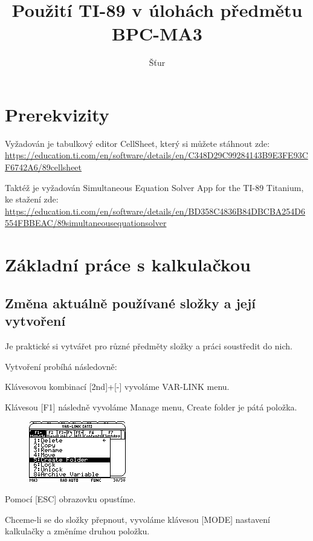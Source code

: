 \documentclass[10pt,a4paper,float]{article}
\author{Šťur}
\title{Použití TI-89 v úlohách předmětu BPC-MA3}
\begin{document}
\maketitle

\pagebreak

\section{Prerekvizity}
Vyžadován je tabulkový editor CellSheet, který si můžete stáhnout zde:\\ \url{https://education.ti.com/en/software/details/en/C348D29C99284143B9E3FE93CF6742A6/89cellsheet}

Taktéž je vyžadován Simultaneous Equation Solver App for the TI-89 Titanium, ke stažení zde:\\ \url{https://education.ti.com/en/software/details/en/BD358C4836B84DBCBA254D6554FBBEAC/89simultaneousequationsolver}

\section{Základní práce s kalkulačkou}
\subsection{Změna aktuálně používané složky a její vytvoření}
Je praktické si vytvářet pro různé předměty složky a práci soustředit do nich.

Vytvoření probíhá následovně:

Klávesovou kombinací [2nd]+[-] vyvoláme VAR-LINK menu.

Klávesou [F1] následně vyvoláme Manage menu, Create folder je pátá položka.

\begin{figure}[H]
	\centering
	\includegraphics[width=.5\textwidth]{img/CREATEFOLDER}
\end{figure}

Pomocí [ESC] obrazovku opustíme.

Chceme-li se do složky přepnout, vyvoláme klávesou [MODE] nastavení kalkulačky a změníme druhou položku.
\end{document}
